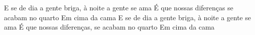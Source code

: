 \beginchorus
E se de dia a gente briga, à noite a gente se ama
É que nossas diferenças se acabam no quarto
Em cima da cama
E se de dia a gente briga, à noite a gente se ama
É que nossas diferenças, se acabam no quarto
Em cima da cama
\endchorus
{}
\vspace{4em} %
\begin{comment}
\lstset{basicstyle=\scriptsize\bf} %
\tab{Solo 1}
\begin{lstlisting}
E|-----------------------------------------------------|
B|-----------------------------------------------------|
G|-----------------------------------------------------|
D|-----------------------------------------------------|
A|-----------------------------------------------------|
E|-----------------------------------------------------|
\end{lstlisting}
\end{comment}
\begin{comment}

\color{drawChord}\gtab{\color{nameChord} X}{}%
\color{drawChord}\gtab{\color{nameChord} X}{}%
\color{drawChord}\gtab{\color{nameChord} X}{}%
\color{drawChord}\gtab{\color{nameChord} X}{}%

\end{comment}
\endsong
